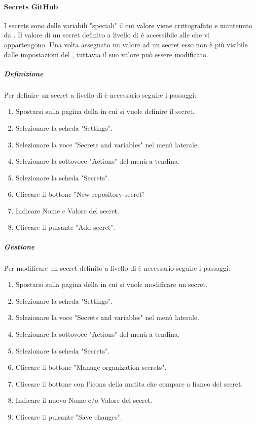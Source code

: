 \paragraph{Secrets GitHub}
I secrets sono delle variabili "speciali" il cui valore viene crittografato e mantenuto da .
Il valore di un secret definito a livello di  è accessibile alle  che vi appartengono.
Una volta assegnato un valore ad un secret esso non è più visibile dalle impostazioni del , tuttavia il suo valore può essere modificato.

\subparagraph{Definizione}
Per definire un secret a livello di  è necessario seguire i passaggi:
\begin{enumerate}
    \item Spostarsi sulla pagina della  in cui si vuole definire il secret.
    \item Selezionare la scheda "Settings".
    \item Selezionare la voce "Secrets and variables" nel menù laterale.
    \item Selezionare la sottovoce "Actions" del menù a tendina.
    \item Selezionare la scheda "Secrets".
    \item Cliccare il bottone "New repository secret" 
    \item Indicare Nome e Valore del secret.
    \item Cliccare il pulsante "Add secret".
\end{enumerate}

\subparagraph{Gestione}
Per modificare un secret definito a livello di  è necessario seguire i passaggi:
\begin{enumerate}
    \item Spostarsi sulla pagina della  in cui si vuole modificare un secret.
    \item Selezionare la scheda "Settings".
    \item Selezionare la voce "Secrets and variables" nel menù laterale.
    \item Selezionare la sottovoce "Actions" del menù a tendina.
    \item Selezionare la scheda "Secrets".
    \item Cliccare il bottone "Manage organization secrets".
    \item Cliccare il bottone con l'icona della matita che compare a fianco del secret.
    \item Indicare il nuovo Nome e/o Valore del secret.
    \item Cliccare il pulsante "Save changes".
\end{enumerate}

